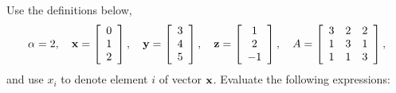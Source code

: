 \documentclass{article}
\begin{document}
Use the definitions below,
\[
\alpha = 2,\quad
\mathbf{x} = \left[\begin{array}{c}
0\\
1\\
2\\
\end{array}\right], \quad 
\mathbf{y} = \left[\begin{array}{c}
3\\
4\\
5\\
\end{array}\right],\quad
\textbf{z} = \left[\begin{array}{c}
1\\
2\\
-1\\
\end{array}\right],\quad
A = \left[\begin{array}{ccc}
3 & 2 & 2\\
1 & 3 & 1\\
1 & 1 & 3
\end{array}\right],
\]
and use $x_i$ to denote element $i$ of vector $\mathbf{x}$.
Evaluate the following expressions:
\end{document}
